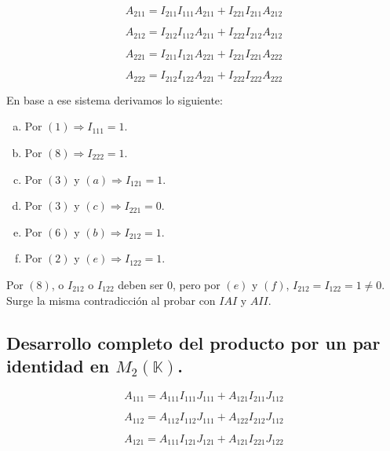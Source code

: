 \documentclass[a4paper, titlepage]{article}
\begin{document}
\begin{equation}
A_{211} = I_{211} I_{111} A_{211} + I_{221} I_{211} A_{212}
\end{equation}

\begin{equation}
A_{212} = I_{212} I_{112} A_{211} + I_{222} I_{212} A_{212}
\end{equation}

\begin{equation}
A_{221} = I_{211} I_{121} A_{221} + I_{221} I_{221} A_{222}
\end{equation}

\begin{equation}
A_{222} = I_{212} I_{122} A_{221} + I_{222} I_{222} A_{222}
\end{equation}

En base a ese sistema derivamos lo siguiente:

\begin{enumerate}[(a)]
	\item Por $(1) \Rightarrow I_{111} = 1$.
	\item Por $(8) \Rightarrow I_{222} = 1$.
	\item Por $(3)$ y $(a) \Rightarrow I_{121} = 1$.
	\item Por $(3)$ y $(c) \Rightarrow I_{221} = 0$.
	\item Por $(6)$ y $(b) \Rightarrow I_{212} = 1$.
	\item Por $(2)$ y $(e) \Rightarrow I_{122} = 1$.
\end{enumerate}

Por $(8)$, o $I_{212}$ o $I_{122}$ deben ser $0$, pero por $(e)$ y $(f)$, $I_{212} = I_{122} = 1 \neq 0$. Surge la misma contradicción al probar con $IAI$ y $AII$.

\subsection{Desarrollo completo del producto por un par identidad en $M_2 (\mathbb{K})$.}

\begin{equation}
A_{111} = A_{111} I_{111} J_{111} + A_{121} I_{211} J_{112}
\end{equation}

\begin{equation}
A_{112} = A_{112} I_{112} J_{111} + A_{122} I_{212} J_{112}
\end{equation}

\begin{equation}
A_{121} = A_{111} I_{121} J_{121} + A_{121} I_{221} J_{122}
\end{equation}
\end{document}
